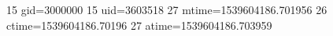 15 gid=3000000
15 uid=3603518
27 mtime=1539604186.701956
26 ctime=1539604186.70196
27 atime=1539604186.703959

